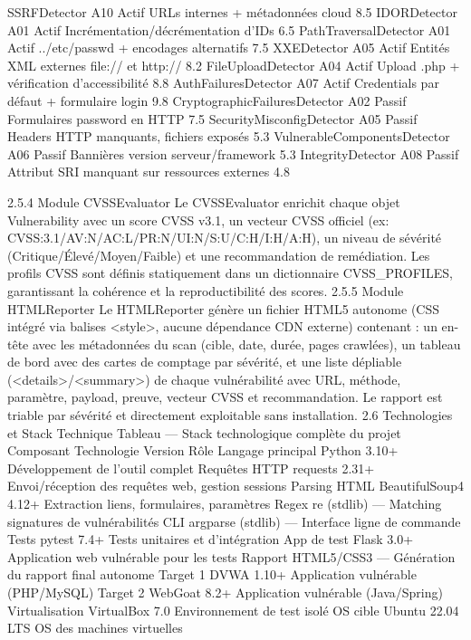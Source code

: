 SSRFDetector	A10	Actif	URLs internes + métadonnées cloud	8.5
IDORDetector	A01	Actif	Incrémentation/décrémentation d'IDs	6.5
PathTraversalDetector	A01	Actif	../etc/passwd + encodages alternatifs	7.5
XXEDetector	A05	Actif	Entités XML externes file:// et http://	8.2
FileUploadDetector	A04	Actif	Upload .php + vérification d'accessibilité	8.8
AuthFailuresDetector	A07	Actif	Credentials par défaut + formulaire login	9.8
CryptographicFailuresDetector	A02	Passif	Formulaires password en HTTP	7.5
SecurityMisconfigDetector	A05	Passif	Headers HTTP manquants, fichiers exposés	5.3
VulnerableComponentsDetector	A06	Passif	Bannières version serveur/framework	5.3
IntegrityDetector	A08	Passif	Attribut SRI manquant sur ressources externes	4.8

2.5.4  Module CVSSEvaluator
Le CVSSEvaluator enrichit chaque objet Vulnerability avec un score CVSS v3.1, un vecteur CVSS officiel (ex: CVSS:3.1/AV:N/AC:L/PR:N/UI:N/S:U/C:H/I:H/A:H), un niveau de sévérité (Critique/Élevé/Moyen/Faible) et une recommandation de remédiation. Les profils CVSS sont définis statiquement dans un dictionnaire CVSS_PROFILES, garantissant la cohérence et la reproductibilité des scores.
2.5.5  Module HTMLReporter
Le HTMLReporter génère un fichier HTML5 autonome (CSS intégré via balises <style>, aucune dépendance CDN externe) contenant : un en-tête avec les métadonnées du scan (cible, date, durée, pages crawlées), un tableau de bord avec des cartes de comptage par sévérité, et une liste dépliable (<details>/<summary>) de chaque vulnérabilité avec URL, méthode, paramètre, payload, preuve, vecteur CVSS et recommandation. Le rapport est triable par sévérité et directement exploitable sans installation.
2.6  Technologies et Stack Technique
Tableau — Stack technologique complète du projet
Composant	Technologie	Version	Rôle
Langage principal	Python	3.10+	Développement de l'outil complet
Requêtes HTTP	requests	2.31+	Envoi/réception des requêtes web, gestion sessions
Parsing HTML	BeautifulSoup4	4.12+	Extraction liens, formulaires, paramètres
Regex	re (stdlib)	—	Matching signatures de vulnérabilités
CLI	argparse (stdlib)	—	Interface ligne de commande
Tests	pytest	7.4+	Tests unitaires et d'intégration
App de test	Flask	3.0+	Application web vulnérable pour les tests
Rapport	HTML5/CSS3	—	Génération du rapport final autonome
Target 1	DVWA	1.10+	Application vulnérable (PHP/MySQL)
Target 2	WebGoat	8.2+	Application vulnérable (Java/Spring)
Virtualisation	VirtualBox	7.0	Environnement de test isolé
OS cible	Ubuntu	22.04 LTS	OS des machines virtuelles

